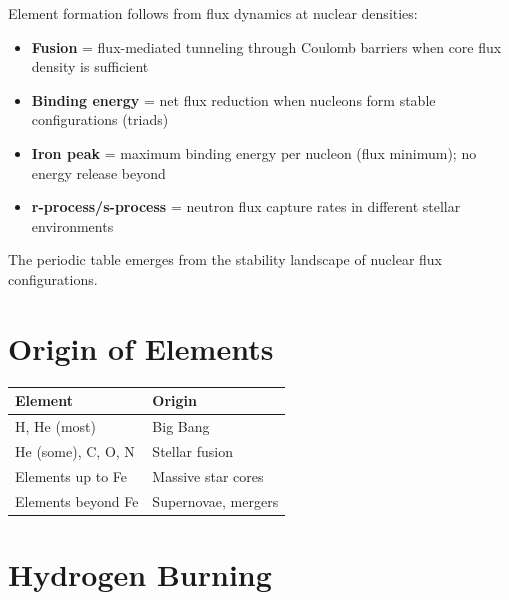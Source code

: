 \documentclass[
  11pt,
  letterpaper,
  twoside,
  openright]{book}
\providecommand{\tightlist}{%
  \setlength{\itemsep}{0pt}\setlength{\parskip}{0pt}}
\begin{document}
\begin{tcolorbox}[enhanced jigsaw, coltitle=black, colbacktitle=quarto-callout-note-color!10!white, toprule=.15mm, colframe=quarto-callout-note-color-frame, arc=.35mm, opacityback=0, bottomtitle=1mm, toptitle=1mm, breakable, colback=white, titlerule=0mm, opacitybacktitle=0.6, title=\textcolor{quarto-callout-note-color}{\faInfo}\hspace{0.5em}{How FTD Produces Nucleosynthesis}, rightrule=.15mm, bottomrule=.15mm, leftrule=.75mm, left=2mm]

Element formation follows from flux dynamics at nuclear densities:

\begin{itemize}
\tightlist
\item
  \textbf{Fusion} = flux-mediated tunneling through Coulomb barriers
  when core flux density is sufficient
\item
  \textbf{Binding energy} = net flux reduction when nucleons form stable
  configurations (triads)
\item
  \textbf{Iron peak} = maximum binding energy per nucleon (flux
  minimum); no energy release beyond
\item
  \textbf{r-process/s-process} = neutron flux capture rates in different
  stellar environments
\end{itemize}

The periodic table emerges from the stability landscape of nuclear flux
configurations.

\end{tcolorbox}

\section{Origin of Elements}\label{origin-of-elements}

\begin{longtable}[]{@{}ll@{}}
\toprule\noalign{}
Element & Origin \\
\midrule\noalign{}
\endhead
\bottomrule\noalign{}
\endlastfoot
H, He (most) & Big Bang \\
He (some), C, O, N & Stellar fusion \\
Elements up to Fe & Massive star cores \\
Elements beyond Fe & Supernovae, mergers \\
\end{longtable}

\section{Hydrogen Burning}\label{hydrogen-burning}
\end{document}
